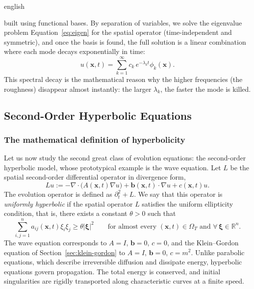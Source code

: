 \documentclass[11pt,letterpaper,twoside,openright]{book} %
\newcommand{\abs}[1]{\left\lvert #1 \right\rvert}
\begin{document}
\begin{hyphenrules}{english}
\begin{enumerate}
    built using functional bases. By separation of variables, we solve the eigenvalue problem
    Equation~\eqref{eq:eigen} for the spatial operator (time-independent and symmetric), and once the basis is
    found, the full solution is a linear combination where each mode decays exponentially in time:
    \begin{equation}
      u(\mathbf{x},t)=\sum_{k=1}^{\infty}c_k\,e^{-\lambda_k t}\phi_k(\mathbf{x}).
      \label{eq:parabolic-modes}
    \end{equation}
    This spectral decay is the mathematical reason why the higher frequencies (the roughness)
    disappear almost instantly: the larger $\lambda_k$, the faster the mode is killed.
\end{enumerate}

\subsection{Second-Order Hyperbolic Equations}\label{subsec:hyperbolic}

\subsubsection{The mathematical definition of hyperbolicity}
Let us now study the second great class of evolution equations: the second-order hyperbolic model,
whose prototypical example is the wave equation. Let $L$ be the spatial second-order differential
operator in divergence form,
\begin{equation}
  Lu:=-\nabla\cdot\big(A(\mathbf{x},t)\nabla u\big)+\mathbf{b}(\mathbf{x},t)\cdot\nabla u+c(\mathbf{x},t)u.
  \label{eq:hyperbolic-op}
\end{equation}
The evolution operator is defined as $\partial_t^2+L$. We say that this operator is \emph{uniformly
hyperbolic} if the spatial operator $L$ satisfies the uniform ellipticity condition, that is, there
exists a constant $\theta>0$ such that
\begin{equation}
  \sum_{i,j=1}^{n}a_{ij}(\mathbf{x},t)\xi_i\xi_j\ge\theta\abs{\bm\xi}^2\qquad
  \text{for almost every }(\mathbf{x},t)\in\Omega_T\text{ and }\forall\,\bm\xi\in\mathbb{R}^n.
  \label{eq:uniform-hyperbolicity}
\end{equation}
The wave equation corresponds to $A=I$, $\mathbf{b}=0$, $c=0$, and the Klein--Gordon equation of
Section~\ref{sec:klein-gordon} to $A=I$, $\mathbf{b}=0$, $c=m^2$. Unlike parabolic equations, which describe
irreversible diffusion and dissipate energy, hyperbolic equations govern propagation. The total energy is
conserved, and initial singularities are rigidly transported along characteristic curves at a finite
speed.


\end{hyphenrules}
\end{document}
